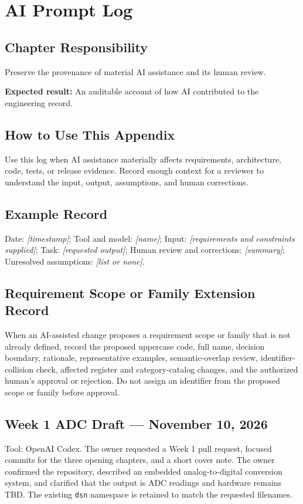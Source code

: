 \chapter{AI Prompt Log}
\section{Chapter Responsibility}
\label{Section:AIPromptLogResponsibility}
Preserve the provenance of material AI assistance and its human review.

\noindent\textbf{Expected result:} An auditable account of how AI contributed to the engineering record.

\section{How to Use This Appendix}
Use this log when AI assistance materially affects requirements, architecture, code, tests, or release evidence. Record enough context for a reviewer to understand the input, output, assumptions, and human corrections.
\section{Example Record}
Date: \textit{[timestamp]}; Tool and model: \textit{[name]}; Input: \textit{[requirements and constraints supplied]}; Task: \textit{[requested output]}; Human review and corrections: \textit{[summary]}; Unresolved assumptions: \textit{[list or none]}.

\section{Requirement Scope or Family Extension Record}
When an AI-assisted change proposes a requirement scope or family that is not
already defined, record the proposed uppercase code, full name, decision
boundary, rationale, representative examples, semantic-overlap review,
identifier-collision check, affected register and category-catalog changes, and
the authorized human's approval or rejection. Do not assign an identifier from
the proposed scope or family before approval.

\section{Week 1 ADC Draft --- November 10, 2026}
\label{Section:WeekOnePromptRecord}
Tool: OpenAI Codex. The owner requested a Week 1 pull request, focused
commits for the three opening chapters, and a short cover note. The owner
confirmed the repository, described an embedded analog-to-digital conversion
system, and clarified that the output is ADC readings and hardware remains TBD.
The existing \texttt{dsn} namespace is retained to match the requested filenames.


